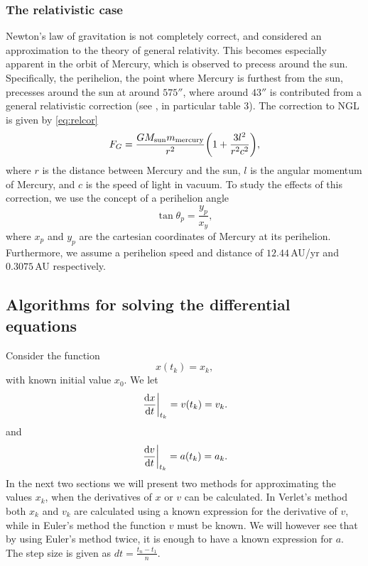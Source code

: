 \subsubsection{The relativistic case}
\label{sec:rel}
Newton's law of gravitation is not completely correct, and considered an approximation
to the theory of general relativity. This becomes especially apparent in the orbit of
Mercury, which is observed to precess around the sun. Specifically, the perihelion, the point where Mercury is furthest from the sun, precesses around the sun at around $575''$, where around $43''$ is
contributed from a general relativistic correction (see \cite{precession}, in particular table 3).
The correction to NGL is given by \ref{eq:relcor}
	\begin{equation}
		\label{eq:relcor}
		F_G = \frac{GM_{\text{sun}}m_{\text{mercury}}}{r^2}\qty(1 + \frac{3l^2}{r^2c^2}),
	\end{equation}
where $r$ is the distance between Mercury and the sun, $l$ is the angular momentum of
Mercury, and $c$ is the speed of light in vacuum. To study the effects of this
correction, we use the concept of a perihelion angle
	\begin{equation}
		\label{eq:perangle}
		\tan{\theta_p} = \frac{y_p}{x_y},
	\end{equation}
where $x_p$ and $y_p$ are the cartesian coordinates of Mercury at its perihelion.
Furthermore, we assume a perihelion speed and distance of $12.44\,$AU/yr and $0.3075\,$AU
respectively.

\subsection{Algorithms for solving the differential equations}
Consider the function
\begin{equation}
	x(t_k)=x_k,
\end{equation}
with known initial value $x_0$. We let
\begin{equation}
\left.\dv{x}{t}\right\rvert_{t_k}=v(t_k)=v_k.
\end{equation}
and
\begin{equation}
\left.\dv{v}{t}\right\rvert_{t_k} = a(t_k)=a_k.
\end{equation}
In the next two sections we will present two methods for approximating the values $x_{k}$, when the derivatives of $x$ or $v$ can be calculated. In Verlet's method both $x_k$ and $v_k$ are calculated using a known expression for the derivative of $v$, while in Euler's method the function $v$ must be known. We will however see that by using Euler's method twice, it is enough to have a known expression for $a$. The step size is given as $dt=\frac{t_n-t_1}{n}$.
